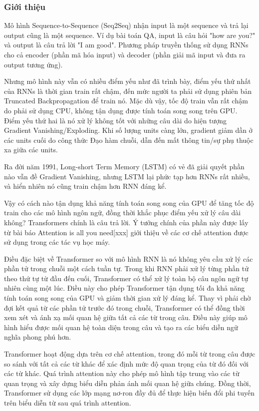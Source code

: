 \subsubsection{Giới thiệu}
Mô hình Sequence-to-Sequence (Seq2Seq) nhận input là một sequence và trả lại output cũng là một sequence. Ví dụ bài toán QA, input là câu hỏi "how are you?" và output là câu trả lời "I am good". Phương pháp truyền thống sử dụng RNNs cho cả encoder (phần mã hóa input) và decoder (phần giải mã input và đưa ra output tương ứng).

Nhưng mô hình này vẫn có nhiều điểm yếu như đã trình bày, điểm yếu thứ nhất của RNNs là thời gian train rất chậm, đến mức người ta phải sử dụng phiên bản Truncated Backpropagation để train nó. Mặc dù vậy, tốc độ train vẫn rất chậm do phải sử dụng CPU, không tận dụng được tính toán song song trên GPU.  Điểm yếu thứ hai là nó xử lý không tốt với những câu dài do hiện tượng Gradient Vanishing/Exploding. Khi số lượng units càng lớn, gradient giảm dần ở các units cuối do công thức Đạo hàm chuỗi, dẫn đến mất thông tin/sự phụ thuộc xa giữa các units.

Ra đời năm 1991, Long-short Term Memory (LSTM) có vẻ đã giải quyết phần nào vẫn đề Gradient Vanishing, nhưng LSTM lại phức tạp hơn RNNs rất nhiều, và hiển nhiên nó cũng train chậm hơn RNN đáng kể.

Vậy có cách nào tận dụng khả năng tính toán song song của GPU để tăng tốc độ train cho các mô hình ngôn ngữ, đồng thời khắc phục điểm yếu xử lý câu dài không? Transformers chính là câu trả lời. Ý tưởng chính của phần này được lấy từ bài báo Attention is all you need[xxx] giới thiệu về các cơ chế attention  được sử dụng trong các tác vụ học máy.

Điều đặc biệt về Transformer so với mô hình RNN là nó không yêu cầu xử lý các phần tử trong chuỗi một cách tuần tự. Trong khi RNN phải xử lý từng phần tử theo thứ tự từ đầu đến cuối, Transformer có thể xử lý toàn bộ câu ngôn ngữ tự nhiên cùng một lúc. Điều này cho phép Transformer tận dụng tối đa khả năng tính toán song song của GPU và giảm thời gian xử lý đáng kể. Thay vì phải chờ đợi kết quả từ các phần tử trước đó trong chuỗi, Transformer có thể đồng thời xem xét và ánh xạ mối quan hệ giữa tất cả các từ trong câu. Điều này giúp mô hình hiểu được mối quan hệ toàn diện trong câu và tạo ra các biểu diễn ngữ nghĩa phong phú hơn.

Transformer hoạt động dựa trên cơ chế attention, trong đó mỗi từ trong câu được so sánh với tất cả các từ khác để xác định mức độ quan trọng của từ đó đối với các từ khác. Quá trình attention này cho phép mô hình tập trung vào các từ quan trọng và xây dựng biểu diễn phản ánh mối quan hệ giữa chúng. Đồng thời, Transformer sử dụng các lớp mạng nơ-ron đầy đủ để thực hiện biến đổi phi tuyến trên biểu diễn từ sau quá trình attention.

